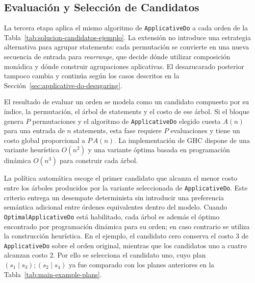 \subsection{Evaluación y Selección de Candidatos}
\label{sec:solucion-evaluacion-seleccion}

La tercera etapa aplica el mismo algoritmo de \texttt{ApplicativeDo} a cada orden de la Tabla~\ref{tab:solucion-candidatos-ejemplo}. La extensión no introduce una estrategia alternativa para agrupar statements: cada permutación se convierte en una nueva secuencia de entrada para \textit{rearrange}, que decide dónde utilizar composición monádica y dónde construir agrupaciones aplicativas. El desazucarado posterior tampoco cambia y continúa según los casos descritos en la Sección~\ref{sec:applicative-do-desugaring}.

El resultado de evaluar un orden se modela como un candidato compuesto por su índice, la permutación, el árbol de statements y el costo de ese árbol. Si el bloque genera $P$ permutaciones y el algoritmo de \texttt{ApplicativeDo} elegido cuesta $A(n)$ para una entrada de $n$ statements, esta fase requiere $P$ evaluaciones y tiene un costo global proporcional a $P\,A(n)$. La implementación de \textsf{GHC} dispone de una variante heurística $O(n^2)$ y una variante óptima basada en programación dinámica $O(n^3)$ para construir cada árbol.

La política automática escoge el primer candidato que alcanza el menor costo entre los árboles producidos por la variante seleccionada de \texttt{ApplicativeDo}. Este criterio entrega un desempate determinista sin introducir una preferencia semántica adicional entre órdenes equivalentes dentro del modelo. Cuando \texttt{OptimalApplicativeDo} está habilitado, cada árbol es además el óptimo encontrado por programación dinámica para su orden; en caso contrario se utiliza la construcción heurística. En el ejemplo, el candidato cero conserva el costo 3 de \texttt{ApplicativeDo} sobre el orden original, mientras que los candidatos uno a cuatro alcanzan costo 2. Por ello se selecciona el candidato uno, cuyo plan $(s_1\mid s_3);(s_2\mid s_4)$ ya fue comparado con los planes anteriores en la Tabla~\ref{tab:main-example-plans}.
